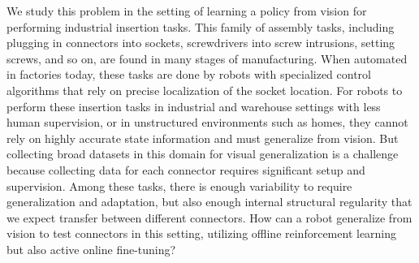 \documentclass[letterpaper, 10 pt, conference, final]{ieeeconf}   %
\begin{document}
We study this problem in the setting of learning a policy from vision for performing industrial insertion tasks.
This family of assembly tasks, including plugging in connectors into sockets, screwdrivers into screw intrusions, setting screws, and so on, are found in many stages of manufacturing.
When automated in factories today, these tasks are done by robots with specialized control algorithms that rely on precise localization of the socket location.
For robots to perform these insertion tasks in industrial and warehouse settings with less human supervision, or in unstructured environments such as homes, they cannot rely on highly accurate state information
and must generalize from vision.
But collecting broad datasets in this domain for visual generalization is a challenge because collecting data for each connector requires significant setup and supervision. 
Among these tasks, there is enough variability to require generalization and adaptation, but also enough internal structural regularity that we expect transfer between different connectors.
How can a robot generalize from vision to test connectors in this setting, utilizing offline reinforcement learning but also active online fine-tuning?
\end{document}
